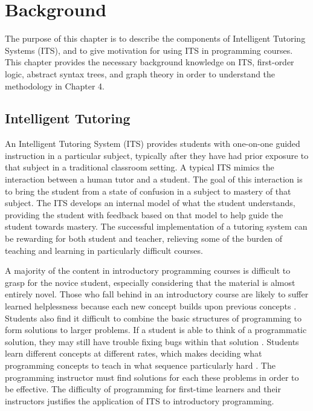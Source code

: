 
\renewcommand{\thechapter}{2}

\chapter{Background}
The purpose of this chapter is to describe the components of Intelligent Tutoring Systems (ITS), and to give motivation for using ITS in programming courses. This chapter provides the necessary background knowledge on ITS, first-order logic, abstract syntax trees, and graph theory in order to understand the methodology in Chapter 4.

\section{Intelligent Tutoring}

An Intelligent Tutoring System (ITS) provides students with one-on-one guided instruction in a particular subject, typically after they have had prior exposure to that subject in a traditional classroom setting. A typical ITS mimics the interaction between a human tutor and a student. The goal of this interaction is to bring the student from a state of confusion in a subject to mastery of that subject. The ITS develops an internal model of what the student understands, providing the student with feedback based on that model to help guide the student towards mastery. The successful implementation of a tutoring system can be rewarding for both student and teacher, relieving some of the burden of teaching and learning in particularly difficult courses.

A majority of the content in introductory programming courses is difficult to grasp for the novice student, especially considering that the material is almost entirely novel. Those who fall behind in an introductory course are likely to suffer learned helplessness because each new concept builds upon previous concepts \cite{Jenkins2002}. Students also find it difficult to combine the basic structures of programming to form solutions to larger problems. If a student is able to think of a programmatic solution, they may still have trouble fixing bugs within that solution \cite{Lahtinen2005}. Students learn different concepts at different rates, which makes deciding what programming concepts to teach in what sequence particularly hard \cite{Rivers2016}. The programming instructor must find solutions for each these problems in order to be effective. The difficulty of programming for first-time learners and their instructors justifies the application of ITS to introductory programming.

